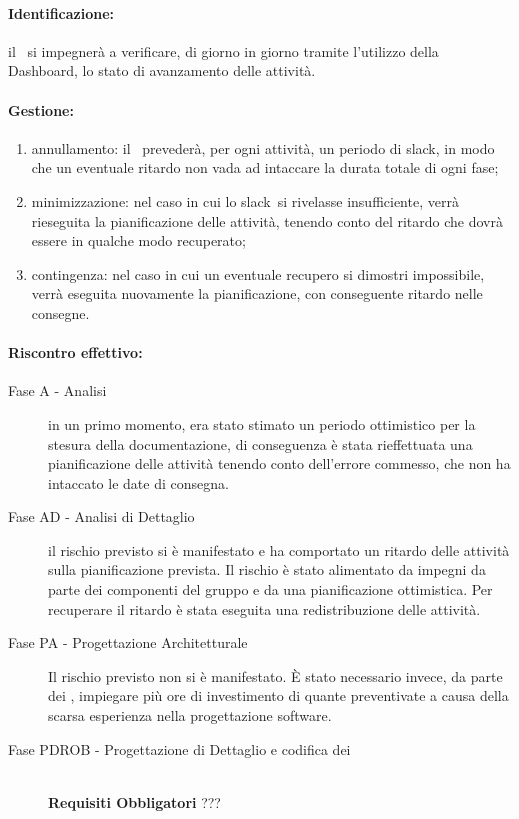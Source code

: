 \documentclass[../PianoProgetto.tex]{subfiles}
\begin{document}
	\paragraph*{Identificazione:} il \responsabilediprogetto\ si impegnerà a verificare, di giorno in giorno tramite l'utilizzo della Dashboard\g, lo stato di avanzamento delle attività.
	
	\paragraph*{Gestione:}
	\begin{enumerate}
		\item annullamento: il \responsabilediprogetto\ prevederà, per ogni attività, un periodo di slack\g, in modo che un eventuale ritardo non vada ad intaccare la durata totale di ogni fase\g ;
		\item minimizzazione: nel caso in cui lo slack\g\ si rivelasse insufficiente, verrà rieseguita la pianificazione delle attività, tenendo conto del ritardo che dovrà essere in qualche modo recuperato;
		\item contingenza: nel caso in cui un eventuale recupero si dimostri impossibile, verrà eseguita nuovamente la pianificazione, con conseguente ritardo nelle consegne.
	\end{enumerate}	
	
	
	\paragraph*{Riscontro effettivo:} 
		\begin{description}
			\item[Fase A - Analisi] in un primo momento, era stato stimato un periodo ottimistico per la stesura della documentazione, di conseguenza è stata rieffettuata una pianificazione delle attività tenendo conto dell'errore commesso, che non ha intaccato le date di consegna.
			\item[Fase AD - Analisi di Dettaglio] il rischio previsto si è manifestato e ha comportato un ritardo delle attività sulla pianificazione prevista. Il rischio è stato alimentato da impegni da parte dei componenti del gruppo e da una pianificazione ottimistica. Per recuperare il ritardo è stata eseguita una redistribuzione delle attività.
			\item[Fase PA - Progettazione Architetturale] Il rischio previsto non si è manifestato. È stato necessario invece, da parte dei \progettisti, impiegare più ore di investimento di quante preventivate a causa della scarsa esperienza nella progettazione software\g.
			\item[Fase PDROB - Progettazione di Dettaglio e codifica dei]  \ \\
					\textbf{Requisiti Obbligatori} ???
		\end{description}
		
\end{document}
